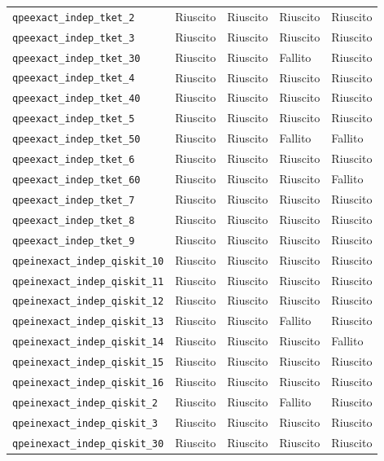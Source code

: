 \begin{longtable}{>{\raggedright\arraybackslash}p{6.8cm}>{\centering\arraybackslash}p{2.0cm}>{\centering\arraybackslash}p{2.0cm}>{\centering\arraybackslash}p{2.0cm}>{\centering\arraybackslash}p{2.0cm}}
\nolinkurl{qpeexact_indep_tket_2} & Riuscito & Riuscito & Riuscito & Riuscito \\
\nolinkurl{qpeexact_indep_tket_3} & Riuscito & Riuscito & Riuscito & Riuscito \\
\nolinkurl{qpeexact_indep_tket_30} & Riuscito & Riuscito & Fallito & Riuscito \\
\nolinkurl{qpeexact_indep_tket_4} & Riuscito & Riuscito & Riuscito & Riuscito \\
\nolinkurl{qpeexact_indep_tket_40} & Riuscito & Riuscito & Riuscito & Riuscito \\
\nolinkurl{qpeexact_indep_tket_5} & Riuscito & Riuscito & Riuscito & Riuscito \\
\nolinkurl{qpeexact_indep_tket_50} & Riuscito & Riuscito & Fallito & Fallito \\
\nolinkurl{qpeexact_indep_tket_6} & Riuscito & Riuscito & Riuscito & Riuscito \\
\nolinkurl{qpeexact_indep_tket_60} & Riuscito & Riuscito & Riuscito & Fallito \\
\nolinkurl{qpeexact_indep_tket_7} & Riuscito & Riuscito & Riuscito & Riuscito \\
\nolinkurl{qpeexact_indep_tket_8} & Riuscito & Riuscito & Riuscito & Riuscito \\
\nolinkurl{qpeexact_indep_tket_9} & Riuscito & Riuscito & Riuscito & Riuscito \\
\nolinkurl{qpeinexact_indep_qiskit_10} & Riuscito & Riuscito & Riuscito & Riuscito \\
\nolinkurl{qpeinexact_indep_qiskit_11} & Riuscito & Riuscito & Riuscito & Riuscito \\
\nolinkurl{qpeinexact_indep_qiskit_12} & Riuscito & Riuscito & Riuscito & Riuscito \\
\nolinkurl{qpeinexact_indep_qiskit_13} & Riuscito & Riuscito & Fallito & Riuscito \\
\nolinkurl{qpeinexact_indep_qiskit_14} & Riuscito & Riuscito & Riuscito & Fallito \\
\nolinkurl{qpeinexact_indep_qiskit_15} & Riuscito & Riuscito & Riuscito & Riuscito \\
\nolinkurl{qpeinexact_indep_qiskit_16} & Riuscito & Riuscito & Riuscito & Riuscito \\
\nolinkurl{qpeinexact_indep_qiskit_2} & Riuscito & Riuscito & Fallito & Riuscito \\
\nolinkurl{qpeinexact_indep_qiskit_3} & Riuscito & Riuscito & Riuscito & Riuscito \\
\nolinkurl{qpeinexact_indep_qiskit_30} & Riuscito & Riuscito & Riuscito & Riuscito \\

\end{longtable}

